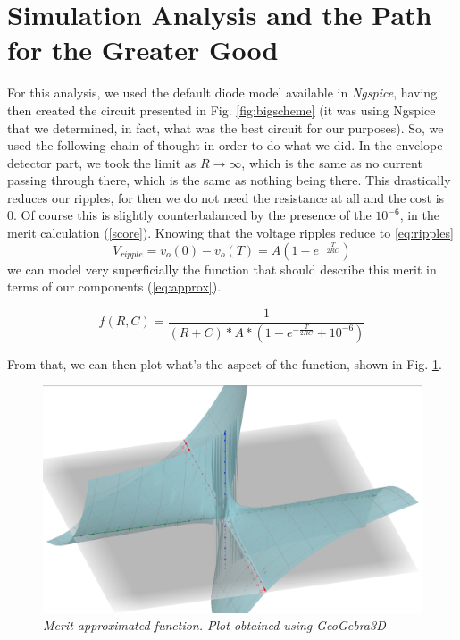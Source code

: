 \section{Simulation Analysis and the Path for the Greater Good}

For this analysis, we used the default diode model available in \textit{Ngspice}, having then created the circuit presented in Fig. \ref{fig:bigscheme} (it was using Ngspice that we determined, in fact, what was the best circuit for our purposes). So, we used the following chain of thought in order to do what we did. In the envelope detector part, we took the limit as $R \rightarrow \infty$, which is the same as no current passing through there, which is the same as nothing being there. This drastically reduces our ripples, for then we do not need the resistance at all and the cost is 0. Of course this is slightly counterbalanced by the presence of the $10^{-6}$, in the merit calculation (\eqref{score}).  Knowing that the voltage ripples reduce to \eqref{eq:ripples}
\begin{equation}
    V_{ripple} = v_o(0) - v_o(T) = A \left(1 - e^{-\frac{T}{2RC}}\right)
    \label{eq:ripples}
\end{equation}
we can model very superficially the function that should describe this merit in terms of our components (\eqref{eq:approx}).

\begin{equation}
    f(R,C) = \frac{1}{(R+C)*A*\left(1 - e^{-\frac{T}{2RC}}+ 10^{-6}\right )}
    \label{eq:approx}
\end{equation}

From that, we can then plot what's the aspect of the function, shown in Fig. \ref{fig:plot2}.

\begin{figure}[H]
    \centering
    \includegraphics[width = 0.85\linewidth]{cost.png}
        \caption{\textit{Merit approximated function. Plot obtained using GeoGebra3D}}
    \label{fig:plot2}
\end{figure}

